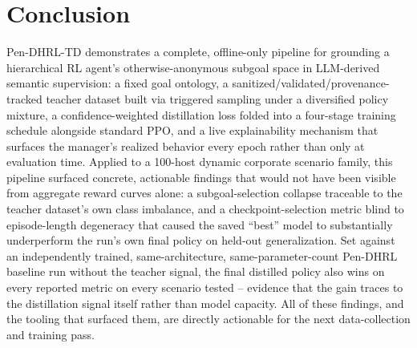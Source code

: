 \documentclass[11pt]{article}
\newcommand{\pendhrl}{Pen-DHRL-TD}
\begin{document}
\section{Conclusion}

\pendhrl{} demonstrates a complete, offline-only pipeline for grounding a
hierarchical RL agent's otherwise-anonymous subgoal space in LLM-derived semantic
supervision: a fixed goal ontology, a sanitized/validated/provenance-tracked teacher
dataset built via triggered sampling under a diversified policy mixture, a
confidence-weighted distillation loss folded into a four-stage training schedule
alongside standard PPO, and a live explainability mechanism that surfaces the
manager's realized behavior every epoch rather than only at evaluation time. Applied
to a 100-host dynamic corporate scenario family, this pipeline surfaced concrete,
actionable findings that would not have been visible from aggregate reward curves
alone: a subgoal-selection collapse traceable to the teacher dataset's own class
imbalance, and a checkpoint-selection metric blind to episode-length degeneracy that
caused the saved ``best'' model to substantially underperform the run's own final
policy on held-out generalization. Set against an independently trained,
same-architecture, same-parameter-count Pen-DHRL baseline run without the teacher
signal, the final distilled policy also wins on every reported metric on every
scenario tested -- evidence that the gain traces to the distillation signal itself
rather than model capacity. All of these findings, and the tooling that surfaced them,
are directly actionable
for the next data-collection and training pass.
\end{document}
